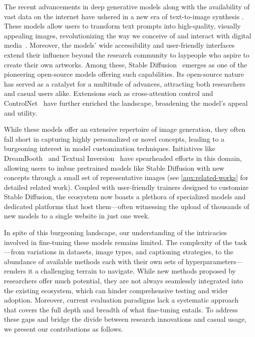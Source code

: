 The recent advancements in deep generative models along with the availability of vast data on the internet have ushered in a new era of text-to-image synthesis \citep{saharia2022photorealistic,ramesh2022hierarchical,balaji2022ediffi}.
These models allow users to transform text prompts into high-quality, visually appealing images, revolutionizing the way we conceive of and interact with digital media~\citep{ko2023large,zhang2023text}.
Moreover, the models' wide accessibility and user-friendly interfaces extend their influence beyond the research community to laypeople who aspire to create their own artworks.
Among these, Stable Diffusion~\citep{rombach2022high} emerges as one of the pioneering open-source models offering such capabilities.
Its open-source nature has served as a catalyst for a multitude of advances, attracting both researchers and casual users alike. Extensions such as cross-attention control \citep{liu2022compositional} and ControlNet~\citep{zhang2023adding} have further enriched the landscape, broadening the model's appeal and utility.

While these models offer an extensive repertoire of image generation, they often fall short in capturing highly personalized or novel concepts, leading to a burgeoning interest in model customization techniques. Initiatives like DreamBooth~\citep{ruiz2023dreambooth} and Textual Inversion~\citep{gal2023an} have spearheaded efforts in this domain, allowing users to imbue pretrained models like Stable Diffusion with new concepts through a small set of representative images (see \cref{apx:related-works} for detailed related work). Coupled with user-friendly trainers designed to customize Stable Diffusion, the ecosystem now boasts a plethora of specialized models and dedicated platforms that host them---often witnessing the upload of thousands of new models to a single website in just one week.

In spite of this burgeoning landscape, our understanding of the intricacies involved in fine-tuning these models remains limited. The complexity of the task---from variations in datasets, image types, and captioning strategies, to the abundance of available methods each with their own sets of hyperparameters---renders it a challenging terrain to navigate. While new methods proposed by researchers offer much potential, they are not always seamlessly integrated into the existing ecosystem, which can hinder comprehensive testing and wider adoption. Moreover, current evaluation paradigms lack a systematic approach that covers the full depth and breadth of what fine-tuning entails. To address these gaps and bridge the divide between research innovations and casual usage, we present our contributions as follows.




